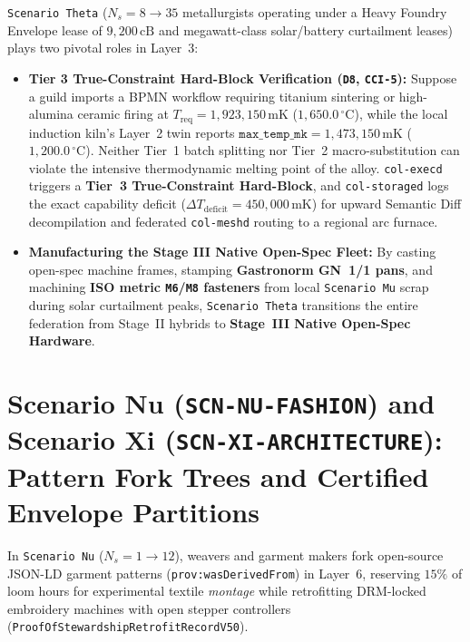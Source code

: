\texttt{Scenario Theta} ($N_s = 8 \to 35$ metallurgists operating under a Heavy Foundry Envelope lease of $9{,}200\,\mathrm{cB}$ and megawatt-class solar/battery curtailment leases) plays two pivotal roles in Layer~3:
\begin{itemize}
    \item \textbf{Tier 3 True-Constraint Hard-Block Verification (\texttt{D8}, \texttt{CCI-5}):} Suppose a guild imports a BPMN workflow requiring titanium sintering or high-alumina ceramic firing at $T_{\mathrm{req}} = 1{,}923{,}150\,\mathrm{mK}$ ($1{,}650.0\,^\circ\mathrm{C}$), while the local induction kiln's Layer~2 twin reports $\texttt{max\_temp\_mk} = 1{,}473{,}150\,\mathrm{mK}$ ($1{,}200.0\,^\circ\mathrm{C}$). Neither Tier~1 batch splitting nor Tier~2 macro-substitution can violate the intensive thermodynamic melting point of the alloy. \texttt{col-execd} triggers a \textbf{Tier~3 True-Constraint Hard-Block}, and \texttt{col-storaged} logs the exact capability deficit ($\Delta T_{\mathrm{deficit}} = 450{,}000\,\mathrm{mK}$) for upward Semantic Diff decompilation and federated \texttt{col-meshd} routing to a regional arc furnace.
    \item \textbf{Manufacturing the Stage III Native Open-Spec Fleet:} By casting open-spec machine frames, stamping \textbf{Gastronorm GN~1/1 pans}, and machining \textbf{ISO metric \texttt{M6}/\texttt{M8} fasteners} from local \texttt{Scenario Mu} scrap during solar curtailment peaks, \texttt{Scenario Theta} transitions the entire federation from Stage~II hybrids to \textbf{Stage~III Native Open-Spec Hardware}.
\end{itemize}

\section{Scenario Nu (\texttt{SCN-NU-FASHION}) and Scenario Xi (\texttt{SCN-XI-ARCHITECTURE}): Pattern Fork Trees and Certified Envelope Partitions}
\label{sec:ch12-nu-xi}

In \texttt{Scenario Nu} ($N_s = 1 \to 12$), weavers and garment makers fork open-source JSON-LD garment patterns (\texttt{prov:wasDerivedFrom}) in Layer~6, reserving $15\%$ of loom hours for experimental textile \textit{montage} while retrofitting DRM-locked embroidery machines with open stepper controllers (\texttt{ProofOfStewardshipRetrofitRecordV50}).

